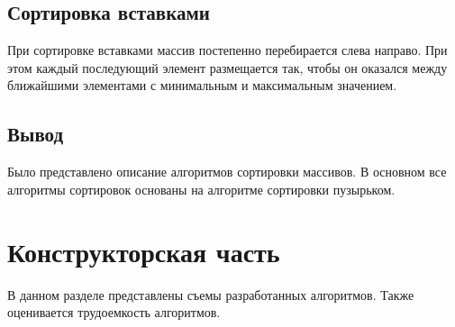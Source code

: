 \documentclass[12pt]{report}
\begin{document}
	\section{Сортировка вставками}
	При сортировке вставками массив постепенно перебирается слева направо. При этом каждый последующий элемент размещается так, чтобы он оказался между ближайшими элементами с минимальным и максимальным значением.
	\section{Вывод}
	Было представлено описание алгоритмов сортировки массивов. В основном все алгоритмы сортировок основаны на алгоритме сортировки пузырьком.

	\chapter{Конструкторская часть}
	В данном разделе представлены съемы разработанных алгоритмов. Также оценивается трудоемкость алгоритмов.
\end{document}
